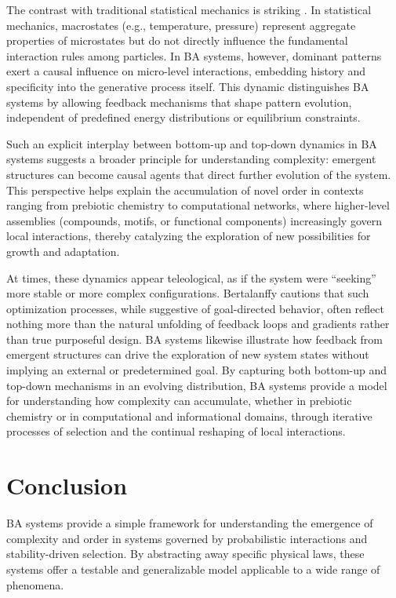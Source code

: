 \documentclass[entropy,article,submit,pdftex,moreauthors]{Definitions/mdpi}
\begin{document}
The contrast with traditional statistical mechanics is striking \cite{landau1980statistical}. In statistical mechanics, macrostates (e.g., temperature, pressure) represent aggregate properties of microstates but do not directly influence the fundamental interaction rules among particles. In BA systems, however, dominant patterns exert a causal influence on micro-level interactions, embedding history and specificity into the generative process itself. This dynamic distinguishes BA systems by allowing feedback mechanisms that shape pattern evolution, independent of predefined energy distributions or equilibrium constraints.

Such an explicit interplay between bottom-up and top-down dynamics in BA systems suggests a broader principle for understanding complexity: emergent structures can become causal agents that direct further evolution of the system. This perspective helps explain the accumulation of novel order in contexts ranging from prebiotic chemistry to computational networks, where higher-level assemblies (compounds, motifs, or functional components) increasingly govern local interactions, thereby catalyzing the exploration of new possibilities for growth and adaptation.

At times, these dynamics appear teleological, as if the system were ``seeking'' more stable or more complex configurations. Bertalanffy \cite{bertalanffy1968general} cautions that such optimization processes, while suggestive of goal-directed behavior, often reflect nothing more than the natural unfolding of feedback loops and gradients rather than true purposeful design. BA systems likewise illustrate how feedback from emergent structures can drive the exploration of new system states without implying an external or predetermined goal. By capturing both bottom-up and top-down mechanisms in an evolving distribution, BA systems provide a model for understanding how complexity can accumulate, whether in prebiotic chemistry or in computational and informational domains, through iterative processes of selection and the continual reshaping of local interactions.


\section{Conclusion}

BA systems provide a simple framework for understanding the emergence of complexity and order in systems governed by probabilistic interactions and stability-driven selection. By abstracting away specific physical laws, these systems offer a testable and generalizable model applicable to a wide range of phenomena. 
\end{document}
